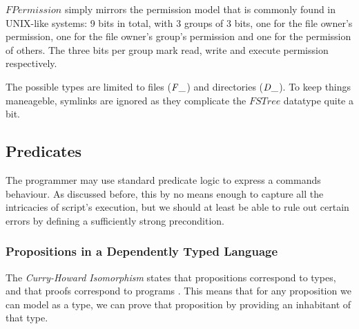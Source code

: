 \documentclass[12pt,a4paper]{article}
\newcommand{\Conid}[1]{\mathit{#1}}
\begin{document}
\ensuremath{\Conid{FPermission}} simply mirrors the permission model that is commonly found in UNIX-like systems: 9 bits in total, with 3 groups of 3 bits, one for the file owner's permission, one for the file owner's group's permission and one for the permission of others. The three bits per group mark read, write and execute permission respectively. 

The possible types are limited to files (\ensuremath{\Conid{F\char95 }}) and directories (\ensuremath{\Conid{D\char95 }}). To keep things maneageble, symlinks are ignored as they complicate the \ensuremath{\Conid{FSTree}} datatype quite a bit.   

\subsection{Predicates}

The programmer may use standard predicate logic to express a commands behaviour. As discussed before, this by no means enough to capture all the intricacies of script's execution, but we should at least be able to rule out certain errors by defining a sufficiently strong precondition. 

\subsubsection{Propositions in a Dependently Typed Language}

The \textit{Curry-Howard Isomorphism} states that propositions correspond to types, and that proofs correspond to programs \cite{wadler15}. This means that for any proposition we can model as a type, we can prove that proposition by providing an inhabitant of that type. 
\end{document}
